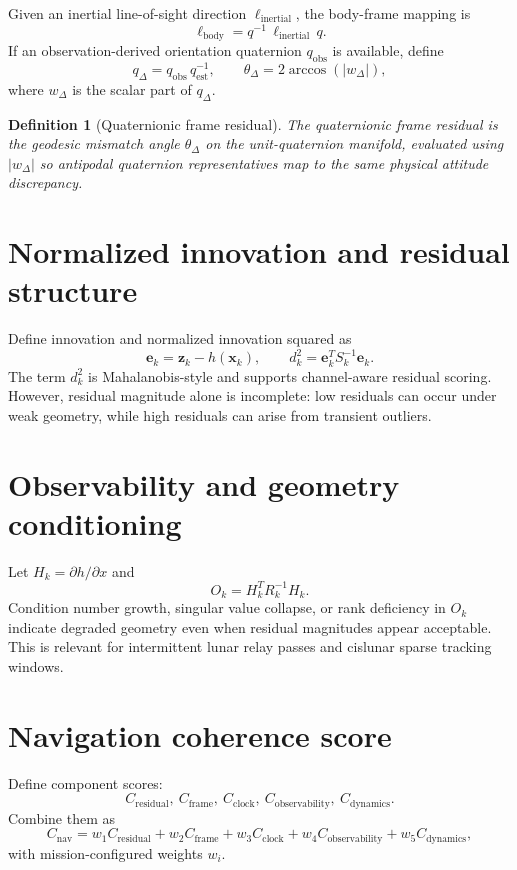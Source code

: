 \documentclass[11pt]{article}
\newtheorem{definition}{Definition}[section]
\theoremstyle{remark}
\begin{document}
Given an inertial line-of-sight direction $\ell_{\text{inertial}}$, the body-frame mapping is
\[
\ell_{\text{body}} = q^{-1}\,\ell_{\text{inertial}}\,q.
\]
If an observation-derived orientation quaternion $q_{\text{obs}}$ is available, define
\[
q_{\Delta} = q_{\text{obs}}\,q_{\text{est}}^{-1},
\qquad
\theta_{\Delta}=2\arccos\!\left(|w_{\Delta}|\right),
\]
where $w_{\Delta}$ is the scalar part of $q_{\Delta}$.

\begin{definition}[Quaternionic frame residual]
The quaternionic frame residual is the geodesic mismatch angle $\theta_{\Delta}$ on the unit-quaternion manifold, evaluated using $|w_{\Delta}|$ so antipodal quaternion representatives map to the same physical attitude discrepancy.
\end{definition}

\section{Normalized innovation and residual structure}

Define innovation and normalized innovation squared as
\[
\mathbf{e}_k = \mathbf{z}_k - h(\mathbf{x}_k),
\qquad
d_k^2 = \mathbf{e}_k^T S_k^{-1}\mathbf{e}_k.
\]
The term $d_k^2$ is Mahalanobis-style and supports channel-aware residual scoring. However, residual magnitude alone is incomplete: low residuals can occur under weak geometry, while high residuals can arise from transient outliers.

\section{Observability and geometry conditioning}

Let $H_k = \partial h / \partial x$ and
\[
O_k = H_k^T R_k^{-1} H_k.
\]
Condition number growth, singular value collapse, or rank deficiency in $O_k$ indicate degraded geometry even when residual magnitudes appear acceptable. This is relevant for intermittent lunar relay passes and cislunar sparse tracking windows.

\section{Navigation coherence score}

Define component scores:
\[
C_{\text{residual}},\ C_{\text{frame}},\ C_{\text{clock}},\ C_{\text{observability}},\ C_{\text{dynamics}}.
\]
Combine them as
\[
C_{\text{nav}} = w_1C_{\text{residual}} + w_2C_{\text{frame}} + w_3C_{\text{clock}} + w_4C_{\text{observability}} + w_5C_{\text{dynamics}},
\]
with mission-configured weights $w_i$.
\end{document}
